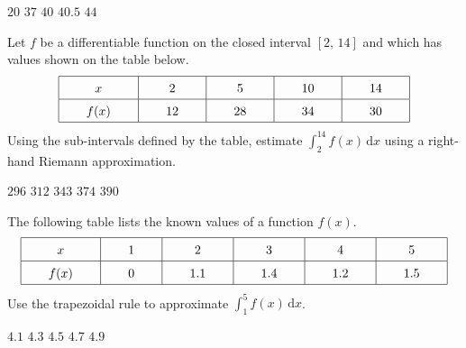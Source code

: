 \begin{questions}
    \begin{oneparchoices}
        \choice $20$
        \choice $37$
        \choice $40$
        \choice $40.5$
        \choice $44$
    \end{oneparchoices} \par \horizontalline

    \question Let $f$ be a differentiable function on the closed interval $[2, \, 14]$ and which has values shown on the table below. \begin{align*}
        \arraycolsep=22pt\def\arraystretch{1.5}
        \begin{array}{|c|c|c|c|c|c|}
            \hline
            x & 2 & 5 & 10 & 14 \\ \hline
            f(x) & 12 & 28 & 34 & 30 \\
            \hline
        \end{array}
    \end{align*}
    Using the sub-intervals defined by the table, estimate $\int_2^{14} f(x) \,\mathrm{d}x$ using a right-hand Riemann approximation. \\

    \begin{oneparchoices}
        \choice $296$
        \choice $312$
        \choice $343$
        \choice $374$
        \choice $390$
    \end{oneparchoices} \par \horizontalline

    \question The following table lists the known values of a function $f(x)$. \begin{align*}
        \arraycolsep=22pt\def\arraystretch{1.5}
        \begin{array}{|c|c|c|c|c|c|c|}
            \hline
            x & 1 & 2 & 3 & 4 & 5 \\ \hline
            f(x) & 0 & 1.1 & 1.4 & 1.2 & 1.5 \\
            \hline
        \end{array}
    \end{align*}
    Use the trapezoidal rule to approximate $\int_1^5 f(x) \,\mathrm{d}x$. \\

    \begin{oneparchoices}
        \choice $4.1$
        \choice $4.3$
        \choice $4.5$
        \choice $4.7$
        \choice $4.9$
    \end{oneparchoices} \par \horizontalline


\end{questions}
